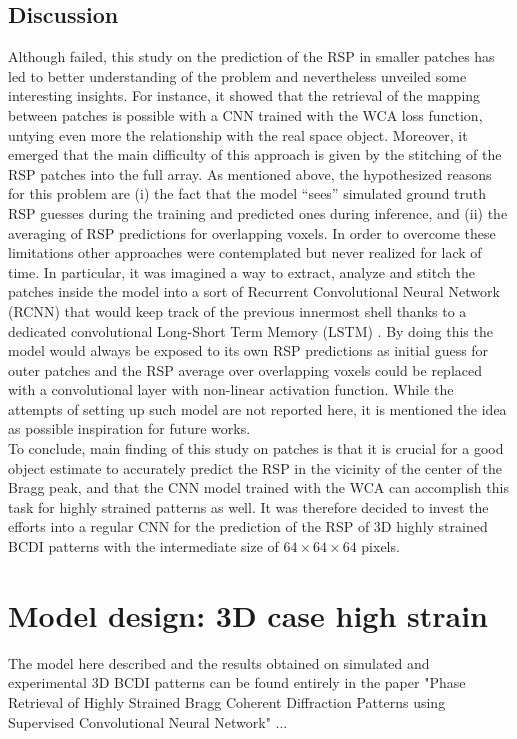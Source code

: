 \subsection{Discussion}
Although failed, this study on the prediction of the RSP in smaller patches has led to better understanding of the problem 
and nevertheless unveiled some interesting insights. For instance, it showed that the retrieval of the mapping between patches 
is possible with a CNN trained with the WCA loss function, untying even more the relationship with the real space object. 
Moreover, it emerged that the main difficulty of this approach is given by the stitching of the RSP patches into the full 
array. As mentioned above, the hypothesized reasons for this problem are (i) the fact that the model ``sees'' 
simulated ground truth RSP guesses during the training and predicted ones during inference, and (ii) the averaging 
of RSP predictions for overlapping voxels. In order to overcome these limitations other approaches were contemplated but 
never realized for lack of time. In particular, it was imagined a way to extract, analyze and stitch the patches inside the 
model into a sort of Recurrent Convolutional Neural Network (RCNN) that would keep track of the previous innermost shell
thanks to a dedicated convolutional Long-Short Term Memory (LSTM) \cite{shi2015convolutionallstmnetworkmachine}. By doing 
this the model would always be exposed to its own RSP predictions as initial guess for outer patches and the RSP average over
overlapping voxels could be replaced with a convolutional layer with non-linear activation function. While the attempts 
of setting up such model are not reported here, it is mentioned the idea as possible inspiration for future works. \\

To conclude, main finding of this study on patches is that it is crucial for a good object estimate to accurately predict 
the RSP in the vicinity of the center of the Bragg peak, and that the CNN model trained with the WCA can accomplish this task 
for highly strained patterns as well. It was therefore decided to invest the efforts into a regular CNN for the prediction 
of the RSP of 3D highly strained BCDI patterns with the intermediate size of $64\times64\times64$ pixels. 

\section{Model design: 3D case high strain }\label{chp:3d_nostrain}
The model here described and the results obtained on simulated and experimental 3D BCDI patterns can be found entirely 
in the paper "Phase Retrieval of Highly Strained Bragg Coherent Diffraction Patterns using Supervised Convolutional Neural Network" ... 

